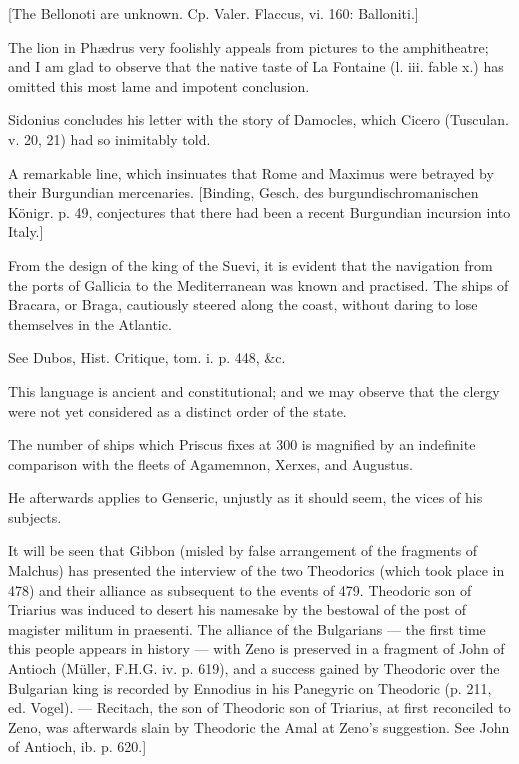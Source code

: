 [The Bellonoti are unknown. Cp. Valer. Flaccus, vi. 160: Balloniti.]

The lion in Phædrus very foolishly appeals from pictures to the amphitheatre; and I am glad to observe that the native taste of La Fontaine (l. iii. fable x.) has omitted this most lame and impotent conclusion.

Sidonius concludes his letter with the story of Damocles, which Cicero (Tusculan. v. 20, 21) had so inimitably told.

A remarkable line, which insinuates that Rome and Maximus were betrayed by their Burgundian mercenaries. [Binding, Gesch. des burgundischromanischen Königr. p. 49, conjectures that there had been a recent Burgundian incursion into Italy.]

From the design of the king of the Suevi, it is evident that the navigation from the ports of Gallicia to the Mediterranean was known and practised. The ships of Bracara, or Braga, cautiously steered along the coast, without daring to lose themselves in the Atlantic.

See Dubos, Hist. Critique, tom. i. p. 448, \&c.

This language is ancient and constitutional; and we may observe that the clergy were not yet considered as a distinct order of the state.

The number of ships which Priscus fixes at 300 is magnified by an indefinite comparison with the fleets of Agamemnon, Xerxes, and Augustus.

He afterwards applies to Genseric, unjustly as it should seem, the vices of his subjects.

It will be seen that Gibbon (misled by false arrangement of the fragments of Malchus) has presented the interview of the two Theodorics (which took place in 478) and their alliance as subsequent to the events of 479. Theodoric son of Triarius was induced to desert his namesake by the bestowal of the post of magister militum in praesenti. The alliance of the Bulgarians \texthebrew{—} the first time this people appears in history \texthebrew{—} with Zeno is preserved in a fragment of John of Antioch (Müller, F.H.G. iv. p. 619), and a success gained by Theodoric over the Bulgarian king is recorded by Ennodius in his Panegyric on Theodoric (p. 211, ed. Vogel). \texthebrew{—} Recitach, the son of Theodoric son of Triarius, at first reconciled to Zeno, was afterwards slain by Theodoric the Amal at Zeno\texthebrew{}’s suggestion. See John of Antioch, ib. p. 620.]
